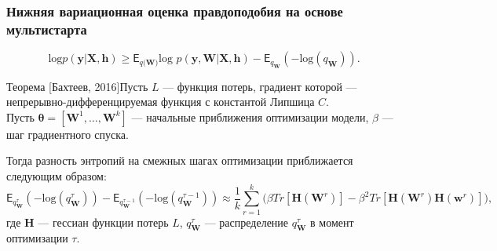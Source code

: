\documentclass[usenames,dvipsnames,11pt,pdf,utf8,russian,aspectratio=43]{beamer}
\begin{document}
\begin{frame}
\small
\frametitle{Нижняя вариационная оценка правдоподобия на основе мультистарта}
$$\text{log}p(\mathbf{y}|\mathbf{X}, \mathbf{h}) \geq \mathsf{E}_{q(\mathbf{W)}}\text{log~}p (\mathbf{y}, \mathbf{W}|\mathbf{X}, \mathbf{h}) - \mathsf{E}_{q_{\mathbf{W}}}(-\text{log}(q_\mathbf{W})).$$

\begin{block}{Теорема [Бахтеев, 2016]}Пусть $L$ --- функция потерь, градиент которой ---  непрерывно-дифференцируемая функция с константой Липшица $C$. \\
Пусть $\boldsymbol{\theta} = [\mathbf{W}^1,\dots,\mathbf{W}^k]$ ---  начальные приближения оптимизации модели, $\beta$ --- шаг градиентного спуска.

Тогда разность энтропий на смежных шагах оптимизации приближается следующим образом:
\small
\[
	\mathsf{E}_{q^{\tau}_{\mathbf{W}}}(-\text{log}(q^{\tau}_\mathbf{W})) -  \mathsf{E}_{q^{\tau-1}_{\mathbf{W}}}(-\text{log}(q^{\tau-1}_\mathbf{W}))  \approx  \frac{1}{k}\sum_{r=1}^k \bigl(\beta Tr[\mathbf{H}(\mathbf{W}^r)] - \beta^2 Tr[\mathbf{H}(\mathbf{W}^r)\mathbf{H}(\mathbf{w}^r)]  \bigr),
\]
где $\mathbf{H}$ --- гессиан функции потерь $L$, $q^{\tau}_\mathbf{W}$ --- распределение $q^{\tau}_\mathbf{W}$ в момент оптимизации $\tau$.
\end{block}
\end{frame}
\end{document}
